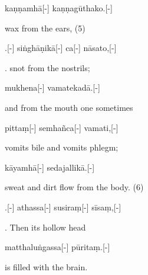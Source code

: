 \begin{samepage}
\begingl[glneveryline={\PaliGlossA,\PaliGlossB}]
kaṇṇamhā[-] kaṇṇagūthako.[-]
\endgl
\nopagebreak
\linespread{0.5}
\begin{spacin}{0.2}
{\PaliGlossFT wax from the ears, (5)}
\end{spacin}
\vskip 12pt
\end{samepage}
\vskip 0.2in
\begin{samepage}
.[-] siṅghāṇikā[-] ca[-] nāsato,[-]
\endgl
\nopagebreak
\linespread{0.5}
\begin{spacin}{0.2}
{. snot from the nostrils;}
\end{spacin}
\vskip 12pt
\end{samepage}
\begin{samepage}
\begingl[glneveryline={\PaliGlossA,\PaliGlossB}]
mukhena[-] vamatekadā.[-]
\endgl
\nopagebreak
\linespread{0.5}
\begin{spacin}{0.2}
{\PaliGlossFT and from the mouth one sometimes}
\end{spacin}
\vskip 12pt
\end{samepage}
\begin{samepage}
\begingl[glneveryline={\PaliGlossA,\PaliGlossB}]
pittaṃ[-] semhañca[-] vamati,[-]
\endgl
\nopagebreak
\linespread{0.5}
\begin{spacin}{0.2}
{\PaliGlossFT vomits bile and vomits phlegm;}
\end{spacin}
\vskip 12pt
\end{samepage}
\begin{samepage}
\begingl[glneveryline={\PaliGlossA,\PaliGlossB}]
kāyamhā[-] sedajallikā.[-]
\endgl
\nopagebreak
\linespread{0.5}
\begin{spacin}{0.2}
{\PaliGlossFT sweat and dirt flow from the body. (6)}
\end{spacin}
\vskip 12pt
\end{samepage}
\vskip 0.2in
\begin{samepage}
.[-] athassa[-] susiraṃ[-] sīsaṃ,[-]
\endgl
\nopagebreak
\linespread{0.5}
\begin{spacin}{0.2}
{. Then its hollow head}
\end{spacin}
\vskip 12pt
\end{samepage}
\begin{samepage}
\begingl[glneveryline={\PaliGlossA,\PaliGlossB}]
matthaluṅgassa[-] pūritaṃ.[-]
\endgl
\nopagebreak
\linespread{0.5}
\begin{spacin}{0.2}
{\PaliGlossFT is filled with the brain.}
\end{spacin}
\vskip 12pt
\end{samepage}
